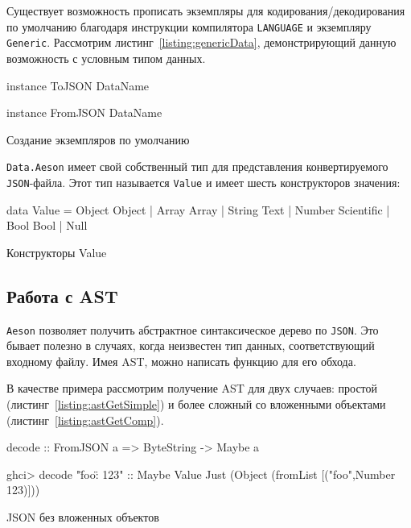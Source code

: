 Существует возможность прописать экземпляры для кодирования/декодирования по умолчанию благодаря инструкции компилятора \lstinline{LANGUAGE} и экземпляру \lstinline{Generic}. Рассмотрим листинг~\ref{listing:genericData}, демонстрирующий данную возможность с условным типом данных. 

\begin{ListingEnv}[H]
\begin{Verb}
instance ToJSON DataName

instance FromJSON DataName
\end{Verb}
\caption{Создание экземпляров по умолчанию}
\label{listing:genericData}
\end{ListingEnv}

\lstinline{Data.Aeson} имеет свой собственный тип для представления конвертируемого \lstinline{JSON}-файла. Этот тип называется \lstinline{Value} и имеет шесть конструкторов значения:

\begin{ListingEnv}[H]
\begin{Verb}
data Value
  = Object Object
  | Array Array
  | String Text
  | Number Scientific
  | Bool Bool
  | Null
\end{Verb}
\caption{Конструкторы Value}
\label{listing:value}
\end{ListingEnv}

\subsection{Работа с AST}

\lstinline{Aeson} позволяет получить абстрактное синтаксическое дерево по \lstinline{JSON}. Это бывает полезно в случаях, когда неизвестен тип данных, соответствующий входному файлу. Имея AST, можно написать функцию для его обхода.~\cite{aesonEx}

В качестве примера рассмотрим получение AST для двух случаев: простой (листинг~\ref{listing:astGetSimple}) и более сложный со вложенными объектами (листинг~\ref{listing:astGetComp}).

\begin{ListingEnv}[H]
\begin{Verb}
decode :: FromJSON a => ByteString -> Maybe a

ghci> decode "{\"foo\": 123}" :: Maybe Value
Just (Object (fromList [("foo",Number 123)]))
\end{Verb}
\caption{JSON без вложенных объектов}
\label{listing:astGetSimple}
\end{ListingEnv}

